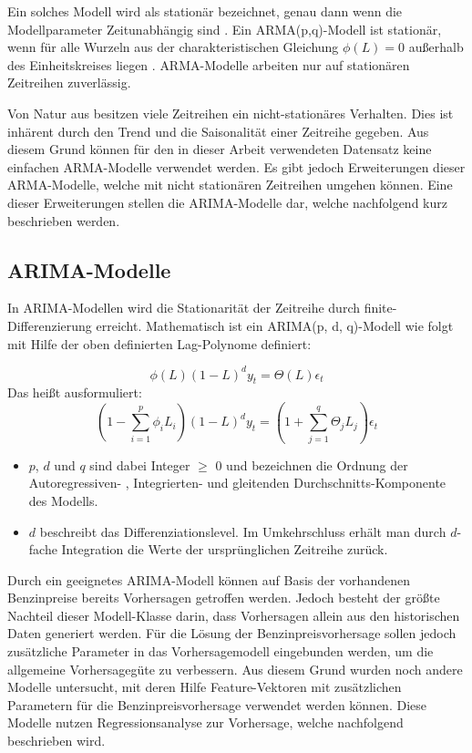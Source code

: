 \documentclass[
ngerman          %
,a4paper          %
,11pt
,pdftex
]{report}
\begin{document}
Ein solches Modell wird als stationär bezeichnet, genau dann wenn die Modellparameter Zeitunabhängig sind \cite[160]{thinkstats}. Ein \ac{ARMA}(p,q)-Modell ist stationär, wenn für alle Wurzeln aus der charakteristischen Gleichung $\phi(L) = 0$ außerhalb des Einheitskreises liegen \cite[20]{timeseries}. \ac{ARMA}-Modelle arbeiten nur auf stationären Zeitreihen zuverlässig. \\
\par 

Von Natur aus besitzen viele Zeitreihen ein nicht-stationäres Verhalten. Dies ist inhärent durch den Trend und die Saisonalität einer Zeitreihe gegeben. Aus diesem Grund können für den in dieser Arbeit verwendeten Datensatz keine einfachen \ac{ARMA}-Modelle verwendet werden. Es gibt jedoch Erweiterungen dieser \ac{ARMA}-Modelle, welche mit nicht stationären Zeitreihen umgehen können. Eine dieser Erweiterungen stellen die \ac{ARIMA}-Modelle dar, welche nachfolgend kurz beschrieben werden.

\subsection{\acf{ARIMA}-Modelle}
In \ac{ARIMA}-Modellen wird die Stationarität der Zeitreihe durch finite-Differenzierung erreicht. Mathematisch ist ein \ac{ARIMA}(p, d, q)-Modell wie folgt mit Hilfe der oben definierten Lag-Polynome definiert:

\begin{equation*}
	\phi(L)(1-L)^d y_t = \Theta(L)\epsilon_t
\end{equation*}
Das heißt ausformuliert:
\begin{equation}
	\left(1-\sum_{i=1}^{p}\phi_i L_i \right) (1-L)^d y_t = \left(1 + \sum_{j=1}^{q} \Theta_j L_j \right) \epsilon_t
\end{equation}

\begin{itemize}
	\item $p$, $d$ und $q$ sind dabei Integer $\geq$ 0 und bezeichnen die Ordnung der Autoregressiven- , Integrierten- und gleitenden Durchschnitts-Komponente des Modells.
	\item $d$ beschreibt das Differenziationslevel. Im Umkehrschluss erhält man durch $d$-fache Integration die Werte der ursprünglichen Zeitreihe zurück.
\end{itemize}

Durch ein geeignetes \ac{ARIMA}-Modell können auf Basis der vorhandenen Benzinpreise bereits Vorhersagen getroffen werden. Jedoch besteht der größte Nachteil dieser Modell-Klasse darin, dass Vorhersagen allein aus den historischen Daten generiert werden. Für die Lösung der Benzinpreisvorhersage sollen jedoch zusätzliche Parameter in das Vorhersagemodell eingebunden werden, um die allgemeine Vorhersagegüte zu verbessern. Aus diesem Grund wurden noch andere Modelle untersucht, mit deren Hilfe Feature-Vektoren mit zusätzlichen Parametern für die Benzinpreisvorhersage verwendet werden können. Diese Modelle nutzen Regressionsanalyse zur Vorhersage, welche nachfolgend beschrieben wird.
\end{document}

